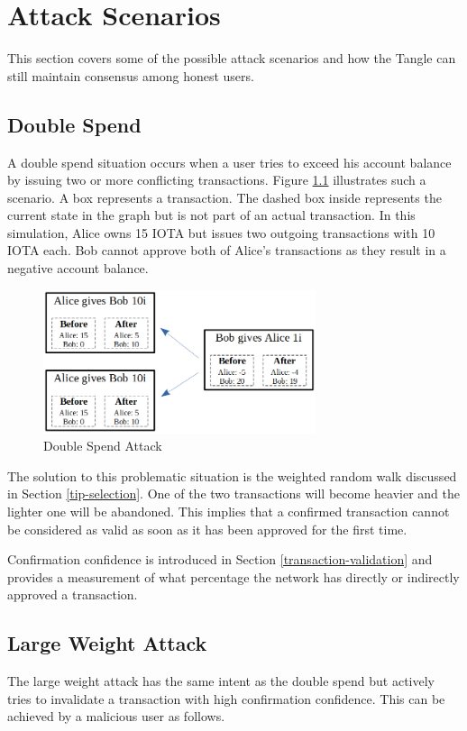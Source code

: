 \chapter{Attack Scenarios}\label{attacks}

This section covers some of the possible attack scenarios and how the Tangle can still maintain consensus among honest users.

\section{Double Spend}
A double spend situation occurs when a user tries to exceed his account balance by issuing two or more conflicting transactions. Figure \ref{fig:double-spend} illustrates such a scenario. A box represents a transaction. The dashed box inside represents the current state in the graph but is not part of an actual transaction. In this simulation, Alice owns 15 IOTA but issues two outgoing transactions with 10 IOTA each. Bob cannot approve both of Alice's transactions as they result in a negative account balance.

\begin{figure}[H]
    \centering
    \includegraphics[width=8cm]{images/double-spend.png}
    \caption{Double Spend Attack \cite{the-tangle-part-5}}
    \label{fig:double-spend}
\end{figure}

The solution to this problematic situation is the weighted random walk discussed in Section \ref{tip-selection}. One of the two transactions will become heavier and the lighter one will be abandoned. This implies that a confirmed transaction cannot be considered as valid as soon as it has been approved for the first time. 

Confirmation confidence is introduced in Section \ref{transaction-validation} and provides a measurement of what percentage the network has directly or indirectly approved a transaction. 


\section{Large Weight Attack}
The large weight attack has the same intent as the double spend but actively tries to invalidate a transaction with high confirmation confidence. This can be achieved by a malicious user as follows.

